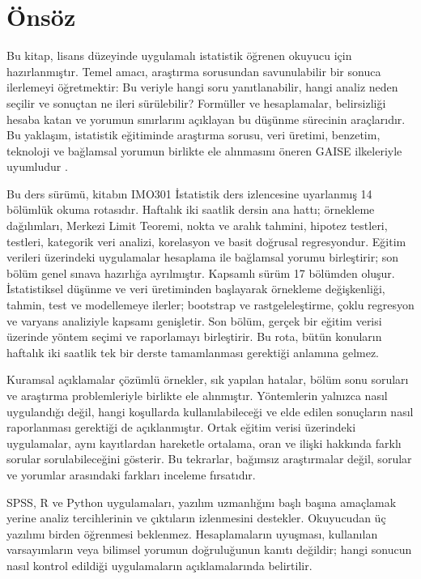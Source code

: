 \chapter*{Önsöz}

Bu kitap, lisans düzeyinde uygulamalı istatistik öğrenen okuyucu için
hazırlanmıştır. Temel amacı, araştırma sorusundan savunulabilir bir sonuca
ilerlemeyi öğretmektir: Bu veriyle hangi soru yanıtlanabilir, hangi analiz
neden seçilir ve sonuçtan ne ileri sürülebilir? Formüller ve hesaplamalar,
belirsizliği hesaba katan ve yorumun sınırlarını açıklayan bu düşünme
sürecinin araçlarıdır.
Bu yaklaşım, istatistik eğitiminde araştırma sorusu, veri üretimi, benzetim,
teknoloji ve bağlamsal yorumun birlikte ele alınmasını öneren GAISE
ilkeleriyle uyumludur \citep{gaise2016}.

\ifimoders
Bu ders sürümü, kitabın IMO301 İstatistik ders izlencesine uyarlanmış
14 bölümlük okuma rotasıdır. Haftalık iki saatlik dersin ana hattı;
örnekleme dağılımları, Merkezi Limit Teoremi, nokta ve aralık tahmini,
hipotez testleri, \tstat testleri, kategorik veri analizi, korelasyon ve basit
doğrusal regresyondur. Eğitim verileri üzerindeki uygulamalar hesaplama ile
bağlamsal yorumu birleştirir; son bölüm genel sınava hazırlığa ayrılmıştır.
\else
Kapsamlı sürüm 17 bölümden oluşur. İstatistiksel düşünme ve veri üretiminden
başlayarak örnekleme değişkenliği, tahmin, test ve modellemeye ilerler;
bootstrap ve rastgeleleştirme, çoklu regresyon ve varyans analiziyle kapsamı
genişletir. Son bölüm, gerçek bir eğitim verisi üzerinde yöntem seçimi ve
raporlamayı birleştirir. Bu rota, bütün konuların haftalık iki saatlik tek
bir derste tamamlanması gerektiği anlamına gelmez.
\fi

Kuramsal açıklamalar çözümlü örnekler, sık yapılan hatalar, bölüm sonu
soruları ve araştırma problemleriyle birlikte ele alınmıştır. Yöntemlerin
yalnızca nasıl uygulandığı değil, hangi koşullarda kullanılabileceği ve elde
edilen sonuçların nasıl raporlanması gerektiği de açıklanmıştır. Ortak eğitim
verisi üzerindeki uygulamalar, aynı kayıtlardan hareketle ortalama, oran ve
ilişki hakkında farklı sorular sorulabileceğini gösterir. Bu tekrarlar,
bağımsız araştırmalar değil, sorular ve yorumlar arasındaki farkları
inceleme fırsatıdır.

SPSS, R ve Python uygulamaları, yazılım uzmanlığını başlı başına amaçlamak
yerine analiz tercihlerinin ve çıktıların izlenmesini destekler. Okuyucudan
üç yazılımı birden öğrenmesi beklenmez. Hesaplamaların uyuşması, kullanılan
varsayımların veya bilimsel yorumun doğruluğunun kanıtı değildir; hangi
sonucun nasıl kontrol edildiği uygulamaların açıklamalarında belirtilir.

